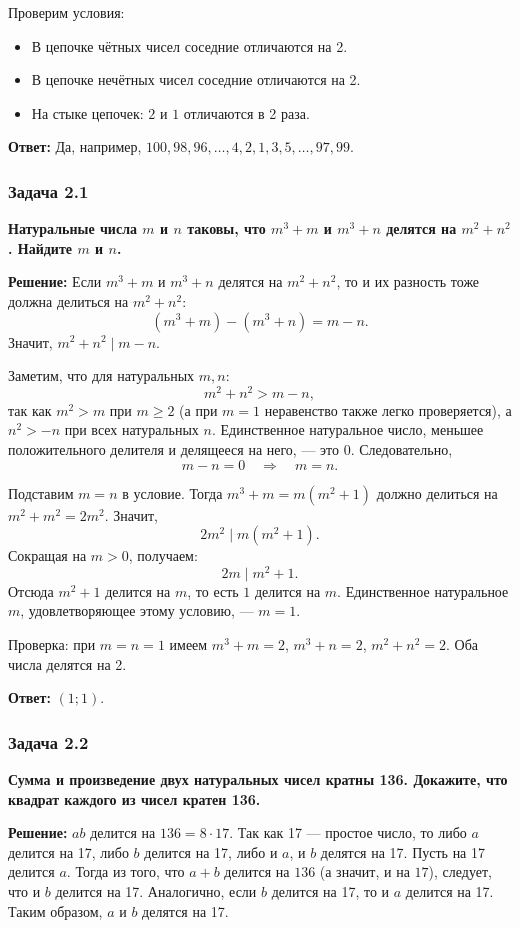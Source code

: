 \documentclass[12pt, a4paper]{article}
\begin{document}
Проверим условия:
\begin{itemize}
    \item В цепочке чётных чисел соседние отличаются на 2.
    \item В цепочке нечётных чисел соседние отличаются на 2.
    \item На стыке цепочек: $2$ и $1$ отличаются в 2 раза.
\end{itemize}

\textbf{Ответ:} Да, например, $100, 98, 96, \ldots, 4, 2, 1, 3, 5, \ldots, 97, 99$.

\subsubsection*{Задача 2.1}
\textbf{Натуральные числа $m$ и $n$ таковы, что $m^3 + m$ и $m^3 + n$ делятся на $m^2 + n^2$. Найдите $m$ и $n$.}

\textbf{Решение:}
Если $m^3 + m$ и $m^3 + n$ делятся на $m^2 + n^2$, то и их разность тоже должна делиться на $m^2 + n^2$:
\[
(m^3 + m) - (m^3 + n) = m - n.
\]
Значит, $m^2 + n^2 \mid m - n$.

Заметим, что для натуральных $m, n$:
\[
m^2 + n^2 > m - n,
\]
так как $m^2 > m$ при $m \ge 2$ (а при $m = 1$ неравенство также легко проверяется), а $n^2 > -n$ при всех натуральных $n$. Единственное натуральное число, меньшее положительного делителя и делящееся на него, — это 0. Следовательно,
\[
m - n = 0 \quad\Rightarrow\quad m = n.
\]

Подставим $m = n$ в условие. Тогда $m^3 + m = m(m^2 + 1)$ должно делиться на $m^2 + m^2 = 2m^2$. Значит,
\[
2m^2 \mid m(m^2 + 1).
\]
Сокращая на $m > 0$, получаем:
\[
2m \mid m^2 + 1.
\]
Отсюда $m^2 + 1$ делится на $m$, то есть $1$ делится на $m$. Единственное натуральное $m$, удовлетворяющее этому условию, — $m = 1$.

Проверка: при $m = n = 1$ имеем $m^3 + m = 2$, $m^3 + n = 2$, $m^2 + n^2 = 2$. Оба числа делятся на 2.

\textbf{Ответ:} $(1; 1)$.

\subsubsection*{Задача 2.2}
\textbf{Сумма и произведение двух натуральных чисел кратны 136. Докажите, что квадрат каждого из чисел кратен 136.}

\textbf{Решение:}
$ab$ делится на $136 = 8 \cdot 17$. Так как 17 — простое число, то либо $a$ делится на 17, либо $b$ делится на 17, либо и $a$, и $b$ делятся на 17. Пусть на 17 делится $a$. Тогда из того, что $a+b$ делится на $136$ (а значит, и на $17$), следует, что и $b$ делится на 17. Аналогично, если $b$ делится на 17, то и $a$ делится на 17. Таким образом, $a$ и $b$ делятся на 17.
\end{document}
